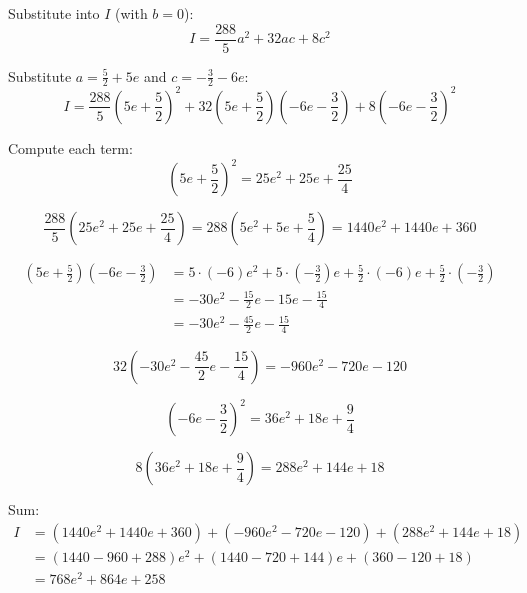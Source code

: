 \documentclass[12pt,a4paper]{article}
\theoremstyle{definition}
\begin{document}
    Substitute into $I$ (with $b=0$):
    \begin{equation}
        I = \frac{288}{5} a^2 + 32 a c + 8 c^2
    \end{equation}

    Substitute $a = \frac{5}{2} + 5e$ and $c = -\frac{3}{2} - 6e$:
    \begin{equation}
        I = \frac{288}{5} \left(5e + \frac{5}{2}\right)^2 + 32 \left(5e + \frac{5}{2}\right) \left(-6e - \frac{3}{2}\right) + 8 \left(-6e - \frac{3}{2}\right)^2
    \end{equation}

    Compute each term:
    \begin{equation}
        \left(5e + \frac{5}{2}\right)^2 = 25e^2 + 25e + \frac{25}{4}
    \end{equation}

    \begin{equation}
        \frac{288}{5} \left(25e^2 + 25e + \frac{25}{4}\right) = 288(5e^2 + 5e + \frac{5}{4}) = 1440e^2 + 1440e + 360
    \end{equation}

    \begin{align}
        \left(5e + \frac{5}{2}\right) \left(-6e - \frac{3}{2}\right) &= 5 \cdot (-6) e^2 + 5 \cdot \left(-\frac{3}{2}\right) e + \frac{5}{2} \cdot (-6) e + \frac{5}{2} \cdot \left(-\frac{3}{2}\right) \\
        &= -30e^2 - \frac{15}{2}e - 15e - \frac{15}{4} \\
        &= -30e^2 - \frac{45}{2}e - \frac{15}{4}
    \end{align}

    \begin{equation}
        32 \left(-30e^2 - \frac{45}{2}e - \frac{15}{4}\right) = -960e^2 - 720e - 120
    \end{equation}

    \begin{equation}
        \left(-6e - \frac{3}{2}\right)^2 = 36e^2 + 18e + \frac{9}{4}
    \end{equation}

    \begin{equation}
        8 \left(36e^2 + 18e + \frac{9}{4}\right) = 288e^2 + 144e + 18
    \end{equation}

    Sum:
    \begin{align}
        I &= (1440e^2 + 1440e + 360) + (-960e^2 - 720e - 120) + (288e^2 + 144e + 18) \\
        &= (1440 - 960 + 288)e^2 + (1440 - 720 + 144)e + (360 - 120 + 18) \\
        &= 768e^2 + 864e + 258
    \end{align}
\end{document}
